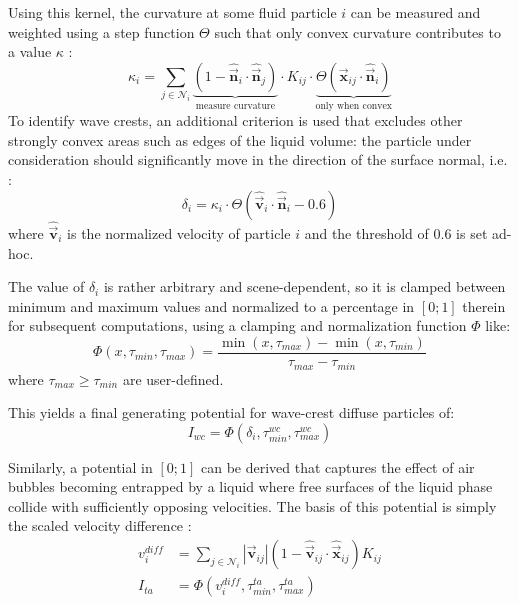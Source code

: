 \documentclass[oneside, a4paper]{book}
\newcounter{phase}[algorithm]
\newcommand\abs[1]{\left|#1\right|}
\newcommand\vek[1]{\vec{\bm{#1}}}
\newcommand\br[1]{\left(#1\right)}
\begin{document}
  Using this kernel, the curvature at some fluid particle $i$ can be measured and weighted using a step function $\Theta$ such that only convex curvature contributes to a value $\kappa$ \autocites{spray-foam-bubbles}{turbulent-micropolar-foam}:
  \begin{equation}
    \kappa_i = \sum_{j\in\mathcal{N}_i} 
    \underbrace{\br{1-\hat{\vek{n}}_i \cdot \hat{\vek{n}}_j}}_{\text{measure curvature}} 
    \cdot 
    K_{ij}\cdot 
    \underbrace{\Theta\br{\vek{x}_{ij}\cdot \hat{\vek{n}}_i}}_{\text{only when convex}}
  \end{equation}
  To identify wave crests, an additional criterion is used that excludes other strongly convex areas such as edges of the liquid volume: the particle under consideration should significantly move in the direction of the surface normal, i.e. \autocite{spray-foam-bubbles}:
  \begin{equation}
    \delta_i = \kappa_i \cdot \Theta\br{\hat{\vek{v}}_{i} \cdot \hat{\vek{n}}_i - 0.6}
  \end{equation}
  where $\hat{\vek{v}}_{i}$ is the normalized velocity of particle $i$ and the threshold of $0.6$ is set ad-hoc.

  The value of $\delta_i$ is rather arbitrary and scene-dependent, so it is clamped between minimum and maximum values and normalized to a percentage in $[0;1]$ therein for subsequent computations, using a clamping and normalization function $\Phi$ like:
  \begin{equation}
    \Phi\br{x,\tau_{min},\tau_{max}} = \frac{\min\br{x, \tau_{max}} - \min\br{x, \tau_{min}}}{\tau_{max}-\tau_{min}}
  \end{equation}
  where $\tau_{max}\geq\tau_{min}$ are user-defined. 

  This yields a final generating potential for wave-crest diffuse particles of:
  \begin{equation}
    I_{wc} = \Phi(\delta_i,\tau_{min}^{wc}, \tau_{max}^{wc})
  \end{equation}

  Similarly, a potential in $[0;1]$ can be derived that captures the effect of air bubbles becoming entrapped by a liquid where free surfaces of the liquid phase collide with sufficiently opposing velocities. The basis of this potential is simply the scaled velocity difference \autocite{spray-foam-bubbles}:
  \begin{align}
    v_i^{diff} &= \sum_{j\in\mathcal{N}_i} \abs{\vek{v}_{ij}} \br{1-\hat{\vek{v}}_{ij}\cdot \hat{\vek{x}}_{ij}} K_{ij}\\
    I_{ta} &= \Phi(v_i^{diff}, \tau_{min}^{ta}, \tau_{max}^{ta})
  \end{align}
\end{document}
